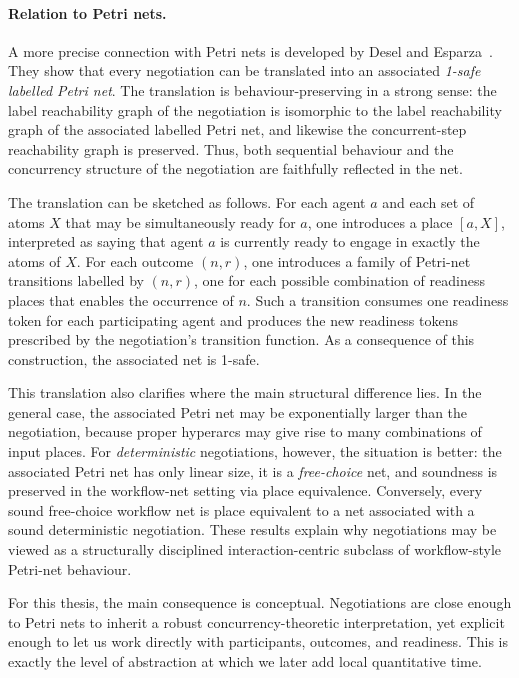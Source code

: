 \paragraph{Relation to Petri nets.}
A more precise connection with Petri nets is developed by Desel and
Esparza~\cite{DeselEsparzaNegPN}. They show that every negotiation can be
translated into an associated \emph{1-safe labelled Petri net}. The translation
is behaviour-preserving in a strong sense: the label reachability graph of the
negotiation is isomorphic to the label reachability graph of the associated
labelled Petri net, and likewise the concurrent-step reachability graph is
preserved. Thus, both sequential behaviour and the concurrency structure of the
negotiation are faithfully reflected in the net.

The translation can be sketched as follows. For each agent \(a\) and each set of
atoms \(X\) that may be simultaneously ready for \(a\), one introduces a place
\([a,X]\), interpreted as saying that agent \(a\) is currently ready to engage in
exactly the atoms of \(X\). For each outcome \((n,r)\), one introduces a family
of Petri-net transitions labelled by \((n,r)\), one for each possible
combination of readiness places that enables the occurrence of \(n\). Such a
transition consumes one readiness token for each participating agent and
produces the new readiness tokens prescribed by the negotiation's transition
function. As a consequence of this construction, the associated net is 1-safe.

This translation also clarifies where the main structural difference lies. In the
general case, the associated Petri net may be exponentially larger than the
negotiation, because proper hyperarcs may give rise to many combinations of
input places. For \emph{deterministic} negotiations, however, the situation is
better: the associated Petri net has only linear size, it is a
\emph{free-choice} net, and soundness is preserved in the workflow-net setting
via place equivalence. Conversely, every sound free-choice workflow net is place
equivalent to a net associated with a sound deterministic negotiation. These
results explain why negotiations may be viewed as a structurally disciplined
interaction-centric subclass of workflow-style Petri-net behaviour.

For this thesis, the main consequence is conceptual. Negotiations are close
enough to Petri nets to inherit a robust concurrency-theoretic interpretation,
yet explicit enough to let us work directly with participants, outcomes, and
readiness. This is exactly the level of abstraction at which we later add local
quantitative time.

